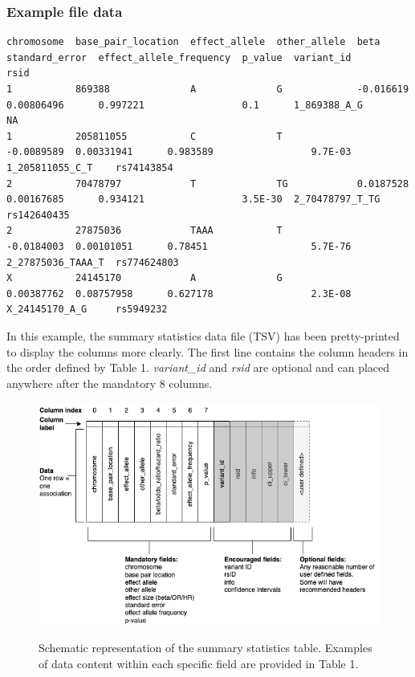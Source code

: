 \documentclass[11pt]{article}
\begin{document}
\begin{landscape}
\subsubsection{Example file data}
\scriptsize
\begin{verbatim}
chromosome  base_pair_location  effect_allele  other_allele  beta        standard_error  effect_allele_frequency  p_value  variant_id         rsid
1           869388              A              G             -0.016619   0.00806496      0.997221                 0.1      1_869388_A_G       NA
1           205811055           C              T             -0.0089589  0.00331941      0.983589                 9.7E-03  1_205811055_C_T    rs74143854
2           70478797            T              TG            0.0187528   0.00167685      0.934121                 3.5E-30  2_70478797_T_TG    rs142640435
2           27875036            TAAA           T             -0.0184003  0.00101051      0.78451                  5.7E-76  2_27875036_TAAA_T  rs774624803
X           24145170            A              G             0.00387762  0.08757958      0.627178                 2.3E-08  X_24145170_A_G     rs5949232
\end{verbatim}

\normalsize
In this example, the summary statistics data file (TSV) has been pretty-printed to display the columns more clearly. The first line contains the column headers in the order defined by Table 1. \textit{variant\_id} and \textit{rsid} are optional and can placed anywhere after the mandatory 8 columns.
\end{landscape}


\begin{figure}[h]
 \centering
 \caption{Schematic representation of the summary statistics table. Examples of data content within each specific field are provided in Table 1.}
 \includegraphics[width=\textwidth]{schematic}
 \label{fig1:schematic}
\end{figure}
\end{document}
